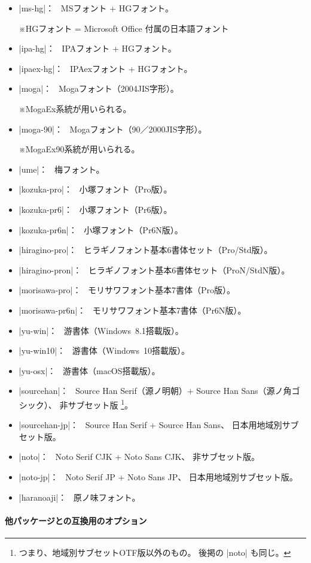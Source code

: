 \documentclass[xelatex,ja=standard,jafont=ipaex,
  a4paper]{bxjsarticle}
\newcommand{\Pkg}[1]{\textsf{#1}}
\newcommand{\Note}{\par\noindent ※}
\newcommand{\Means}{：\ }
\begin{document}
\begin{itemize}
\item |ms-hg|\Means
  MSフォント + HGフォント。
  \Note HGフォント = Microsoft Office 付属の日本語フォント
\item |ipa-hg|\Means
  IPAフォント + HGフォント。
\item |ipaex-hg|\Means
  IPAexフォント + HGフォント。
\item |moga|\Means
  Mogaフォント（2004JIS字形）。
  \Note MogaEx系統が用いられる。
\item |moga-90|\Means
  Mogaフォント（90／2000JIS字形）。
  \Note MogaEx90系統が用いられる。
\item |ume|\Means
  梅フォント。
\item |kozuka-pro|\Means
  小塚フォント（Pro版）。
\item |kozuka-pr6|\Means
  小塚フォント（Pr6版）。
\item |kozuka-pr6n|\Means
  小塚フォント（Pr6N版）。
\item |hiragino-pro|\Means
  ヒラギノフォント基本6書体セット（Pro/Std版）。
\item |hiragino-pron|\Means
  ヒラギノフォント基本6書体セット（ProN/StdN版）。
\item |morisawa-pro|\Means
  モリサワフォント基本7書体（Pro版）。
\item |morisawa-pr6n|\Means
  モリサワフォント基本7書体（Pr6N版）。
\item |yu-win|\Means
  游書体（Windows~8.1搭載版）。
\item |yu-win10|\Means
  游書体（Windows~10搭載版）。%
\item |yu-osx|\Means
  游書体（macOS搭載版）。
\item |sourcehan|\Means
  Source Han Serif（源ノ明朝）+ Source Han Sans（源ノ角ゴシック）、
  非サブセット版%
  \footnote{つまり、地域別サブセットOTF版以外のもの。
    後掲の |noto| も同じ。}。
\item |sourcehan-jp|\Means
  Source Han Serif + Source Han Sans、
  日本用地域別サブセット版。
\item |noto|\Means
  Noto Serif CJK + Noto Sans CJK、
  非サブセット版。
\item |noto-jp|\Means
  Noto Serif JP + Noto Sans JP、
  日本用地域別サブセット版。
\item |haranoaji|\Means
  原ノ味フォント。
\end{itemize}

\paragraph{他パッケージとの互換用のオプション}
\mbox{}
\end{document}

